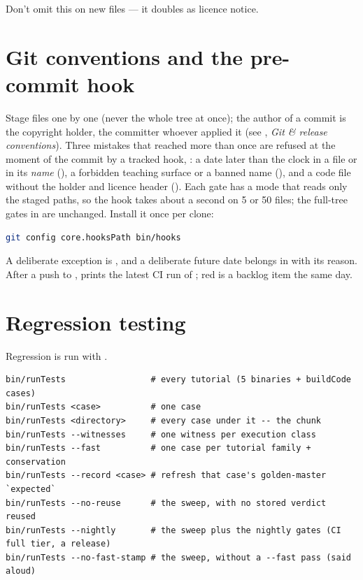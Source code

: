 \documentclass[11pt,a4paper]{article}
\begin{document}
Don't omit this on new files --- it doubles as licence notice.

\section{Git conventions and the pre-commit hook}\label{sec:git-hook}

Stage files one by one (never the whole tree at once); the author of a commit
is the copyright holder, the committer whoever applied it (see
, \emph{Git \& release conventions}).  Three mistakes that
reached  more than once are refused at the moment of the commit by a
tracked hook, : a date later than the clock in a file
or in its \emph{name} (), a forbidden teaching
surface or a banned name (), and a code file without the
holder and licence header ().  Each gate has a
 mode that reads only the staged paths, so the hook takes about a
second on 5 or 50 files; the full-tree gates in  are
unchanged.  Install it once per clone:

\begin{lstlisting}[language=bash]
git config core.hooksPath bin/hooks
\end{lstlisting}

A deliberate exception is , and a deliberate
future date belongs in  with its
reason.  After a push to ,  prints
the latest CI run of ; red is a backlog item the same day.

\section{Regression testing}\label{sec:regression}

Regression is run with .

\begin{lstlisting}
bin/runTests                 # every tutorial (5 binaries + buildCode cases)
bin/runTests <case>          # one case
bin/runTests <directory>     # every case under it -- the chunk
bin/runTests --witnesses     # one witness per execution class
bin/runTests --fast          # one case per tutorial family + conservation
bin/runTests --record <case> # refresh that case's golden-master `expected`
bin/runTests --no-reuse      # the sweep, with no stored verdict reused
bin/runTests --nightly       # the sweep plus the nightly gates (CI full tier, a release)
bin/runTests --no-fast-stamp # the sweep, without a --fast pass (said aloud)
\end{lstlisting}
\end{document}

